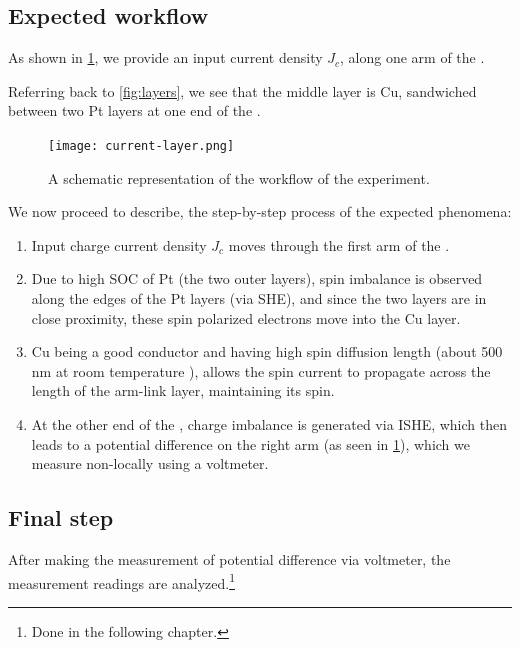 \subsection{Expected workflow}

As shown in \cref{fig:layer-workflow}, we provide an input current density \( J_c \), along one arm of the \Hst.

Referring back to \cref{fig:layers}, we see that the middle layer is Cu, sandwiched between two Pt layers at one end of the \Hst.

\begin{figure}
    \centering
    \texttt{[image: current-layer.png]}
    \caption{A schematic representation of the workflow of the experiment.}
    \label{fig:layer-workflow}
\end{figure}

We now proceed to describe, the step-by-step process of the expected phenomena:

\begin{enumerate}
    \item Input charge current density \( J_c \) moves through the first arm of the \Hst.
    \item Due to high SOC of Pt (the two outer layers), spin imbalance is observed along the edges of the Pt layers (via SHE), and since the two layers are in close proximity, these spin polarized electrons move into the Cu layer.
    \item Cu being a good conductor and having high spin diffusion length (about 500 nm at room temperature \cite{Kimura_2005}), allows the spin current to propagate across the length of the arm-link layer, maintaining its spin.
    \item At the other end of the \Hst, charge imbalance is generated via ISHE, which then leads to a potential difference on the right arm (as seen in \cref{fig:layer-workflow}), which we measure non-locally using a voltmeter.
\end{enumerate}


\subsection{Final step}

After making the measurement of potential difference via voltmeter, the measurement readings are analyzed.\footnote{Done in the following chapter.}
